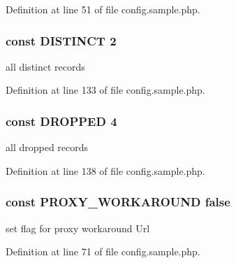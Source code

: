 Definition at line 51 of file config.\+sample.\+php.

\subsubsection[{\texorpdfstring{D\+I\+S\+T\+I\+N\+CT}{DISTINCT}}]{\setlength{\rightskip}{0pt plus 5cm}const D\+I\+S\+T\+I\+N\+CT 2}\hypertarget{namespace_bms_a99cb80c249c1d51aa36375cca5921896}{}\label{namespace_bms_a99cb80c249c1d51aa36375cca5921896}
all distinct records 

Definition at line 133 of file config.\+sample.\+php.

\subsubsection[{\texorpdfstring{D\+R\+O\+P\+P\+ED}{DROPPED}}]{\setlength{\rightskip}{0pt plus 5cm}const D\+R\+O\+P\+P\+ED 4}\hypertarget{namespace_bms_ac8aa145c99391c64083d1ab9451eedef}{}\label{namespace_bms_ac8aa145c99391c64083d1ab9451eedef}
all dropped records 

Definition at line 138 of file config.\+sample.\+php.

\subsubsection[{\texorpdfstring{P\+R\+O\+X\+Y\+\_\+\+W\+O\+R\+K\+A\+R\+O\+U\+ND}{PROXY_WORKAROUND}}]{\setlength{\rightskip}{0pt plus 5cm}const P\+R\+O\+X\+Y\+\_\+\+W\+O\+R\+K\+A\+R\+O\+U\+ND false}\hypertarget{namespace_bms_a83815bb64763ef7810008cfe96d0ecf7}{}\label{namespace_bms_a83815bb64763ef7810008cfe96d0ecf7}
set flag for proxy workaround Url 

Definition at line 71 of file config.\+sample.\+php.

